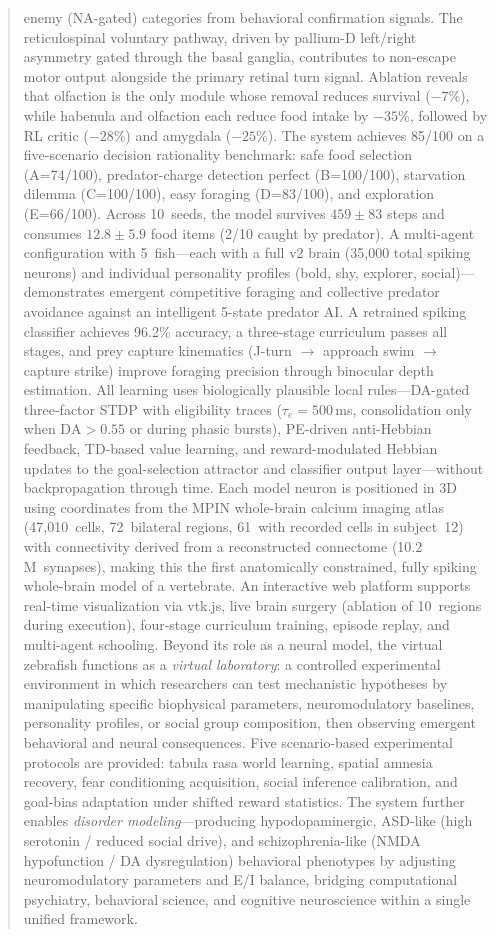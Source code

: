 \documentclass[12pt]{article}
\begin{document}
\begin{abstract}
enemy (NA-gated) categories from behavioral confirmation signals.
The reticulospinal voluntary pathway, driven by pallium-D left/right
asymmetry gated through the basal ganglia, contributes to non-escape
motor output alongside the primary retinal turn signal.
Ablation reveals that olfaction is the only module whose removal reduces
survival ($-7\%$), while habenula and olfaction each reduce food intake by
$-35\%$, followed by RL critic ($-28\%$) and amygdala ($-25\%$).
The system achieves 85/100 on a five-scenario decision rationality
benchmark: safe food selection (A=74/100), predator-charge detection
perfect (B=100/100), starvation dilemma (C=100/100), easy foraging
(D=83/100), and exploration (E=66/100).
Across 10~seeds, the model survives $459 \pm 83$ steps and consumes
$12.8 \pm 5.9$ food items (2/10 caught by predator).
A multi-agent configuration with 5~fish---each with a full v2 brain
(35,000 total spiking neurons) and individual personality profiles
(bold, shy, explorer, social)---demonstrates emergent competitive
foraging and collective predator avoidance against an intelligent
5-state predator AI.
A retrained spiking classifier achieves 96.2\% accuracy, a
three-stage curriculum passes all stages, and prey capture kinematics
(J-turn $\to$ approach swim $\to$ capture strike) improve foraging
precision through binocular depth estimation.
All learning uses biologically plausible local rules---DA-gated
three-factor STDP with eligibility traces ($\tau_e = 500$\,ms,
consolidation only when $\text{DA} > 0.55$ or during phasic bursts),
PE-driven anti-Hebbian feedback, TD-based value learning, and
reward-modulated Hebbian updates to the goal-selection attractor and
classifier output layer---without backpropagation through time.
Each model neuron is positioned in 3D using coordinates from the MPIN
whole-brain calcium imaging atlas (47,010~cells, 72~bilateral regions,
61~with recorded cells in subject~12) with
connectivity derived from a reconstructed connectome (10.2\,M~synapses),
making this the first anatomically constrained, fully spiking
whole-brain model of a vertebrate.
An interactive web platform supports real-time visualization via vtk.js,
live brain surgery (ablation of 10~regions during execution), four-stage
curriculum training, episode replay, and multi-agent schooling.
Beyond its role as a neural model, the virtual zebrafish functions as a
\emph{virtual laboratory}: a controlled experimental environment in which
researchers can test mechanistic hypotheses by manipulating specific
biophysical parameters, neuromodulatory baselines, personality profiles, or
social group composition, then observing emergent behavioral and neural
consequences.
Five scenario-based experimental protocols are provided:
tabula rasa world learning, spatial amnesia recovery, fear conditioning
acquisition, social inference calibration, and goal-bias adaptation under
shifted reward statistics.
The system further enables \emph{disorder modeling}---producing
hypodopaminergic, ASD-like (high serotonin / reduced social drive), and
schizophrenia-like (NMDA hypofunction / DA dysregulation) behavioral
phenotypes by adjusting neuromodulatory parameters and E/I balance,
bridging computational psychiatry, behavioral science, and cognitive
neuroscience within a single unified framework.


\end{abstract}
\end{document}
